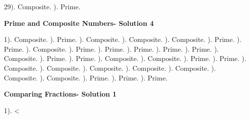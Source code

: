 \documentclass{article}%
\begin{document}
29). Composite.%
). Prime.%
\newline%
\newpage%
\large%
\begin{center}%
\textbf{Prime and Composite Numbers- Solution 4}%
\newline%
\end{center} \normalsize%
1). Composite.%
). Prime.%
). Composite.%
). Composite.%
). Composite.%
). Prime.%
). Prime.%
). Composite.%
). Prime.%
). Prime.%
). Prime.%
). Prime.%
). Prime.%
). Composite.%
). Prime.%
). Prime.%
). Composite.%
). Composite.%
). Prime.%
). Prime.%
). Composite.%
). Composite.%
). Composite.%
). Composite.%
). Composite.%
). Composite.%
). Composite.%
). Prime.%
). Prime.%
). Prime.%
\newline%
\newpage%
\large%
\begin{center}%
\textbf{Comparing Fractions- Solution 1}%
\newline%
\end{center} \normalsize%
1). <%
\newline%
\end{document}
